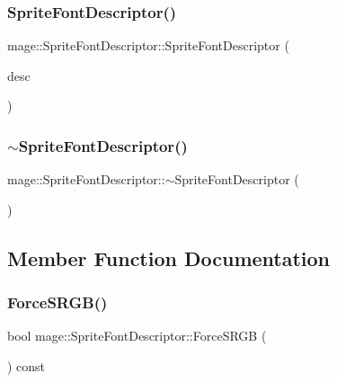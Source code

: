 \subsubsection{\texorpdfstring{Sprite\+Font\+Descriptor()}{SpriteFontDescriptor()}\hspace{0.1cm}{\footnotesize\ttfamily [3/3]}}
{\footnotesize\ttfamily mage\+::\+Sprite\+Font\+Descriptor\+::\+Sprite\+Font\+Descriptor (\begin{DoxyParamCaption}\item[{\hyperlink{structmage_1_1_sprite_font_descriptor}{Sprite\+Font\+Descriptor} \&\&}]{desc }\end{DoxyParamCaption})\hspace{0.3cm}{\ttfamily [default]}}

\hypertarget{structmage_1_1_sprite_font_descriptor_ab259871eed5ca9be3830d7da9cfc7092}{}\label{structmage_1_1_sprite_font_descriptor_ab259871eed5ca9be3830d7da9cfc7092} 
\subsubsection{\texorpdfstring{$\sim$\+Sprite\+Font\+Descriptor()}{~SpriteFontDescriptor()}}
{\footnotesize\ttfamily mage\+::\+Sprite\+Font\+Descriptor\+::$\sim$\+Sprite\+Font\+Descriptor (\begin{DoxyParamCaption}{ }\end{DoxyParamCaption})\hspace{0.3cm}{\ttfamily [default]}}



\subsection{Member Function Documentation}
\hypertarget{structmage_1_1_sprite_font_descriptor_a255defd4a4d706c37a755c0144c2a927}{}\label{structmage_1_1_sprite_font_descriptor_a255defd4a4d706c37a755c0144c2a927} 
\subsubsection{\texorpdfstring{Force\+S\+R\+G\+B()}{ForceSRGB()}}
{\footnotesize\ttfamily bool mage\+::\+Sprite\+Font\+Descriptor\+::\+Force\+S\+R\+GB (\begin{DoxyParamCaption}{ }\end{DoxyParamCaption}) const}

